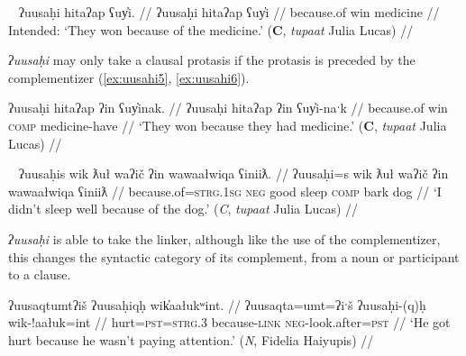 \ex~ \label{ex:uusahi4}
\begingl
\glpreamble *ʔuusaḥi hitaʔap ʕuy̓i. //
\gla ʔuusaḥi hitaʔap ʕuy̓i //
\glb because.of win medicine //
\glft Intended: `They won because of the medicine.' (\textbf{C}, \textit{tupaat} Julia Lucas) //
\endgl
\xe

\textit{ʔuusaḥi} may only take a clausal protasis if the protasis is preceded by the complementizer (\ref{ex:uusahi5}, \ref{ex:uusahi6}).

\ex \label{ex:uusahi5}
\begingl
\glpreamble ʔuusaḥi hitaʔap ʔin ʕuy̓inak. //
\gla ʔuusaḥi hitaʔap ʔin ʕuy̓i-naˑk //
\glb because.of win \textsc{comp} medicine-have  //
\glft `They won because they had medicine.' (\textbf{C}, \textit{tupaat} Julia Lucas) //
\endgl
\xe

\ex~ \label{ex:uusahi6}
\begingl
\glpreamble ʔuusaḥis wik ƛuł waʔič ʔin wawaałwiqa ʕiniiƛ. //
\gla ʔuusaḥi=s wik ƛuł waʔič ʔin wawaałwiqa ʕiniiƛ //
\glb because.of=\textsc{strg.1sg} \textsc{neg} good sleep \textsc{comp} bark dog  //
\glft `I didn't sleep well because of the dog.' (\textit{C}, \textit{tupaat} Julia Lucas) //
\endgl
\xe

\begin{comment}
[[TODO: uusahi plus linker ]]
\textit{ʔuusaḥi} may only be able to take the linker when it is non-initial. Both consultants with whom I attempted to add a linker to an ʔuusaḥi-initial sentence were uncertain if it was okay or not but felt it was weird (\ref{ex:uusahi7}, \ref{ex:uusahi8}).

\ex \label{ex:uusahi7}
\begingl
\glpreamble ?? ʔuusaḥiqḥita nay̓aqakʔi wikitaḥ ƛuł weʔič. //
\gla ʔuusaḥi-(q)ḥ=(m)it=(m)aˑ nay̓aqak=ʔiˑ wik=(m)it=(m)aˑḥ ƛuł weʔič //
\glb because.of-\textsc{link}=\textsc{pst}=\textsc{real.3} baby=\textsc{art} \textsc{neg}=\textsc{pst}=\textsc{real.1sg} good sleep //
\glft Intended: `I didn't sleep well because of the baby.' (\textbf{B}, Bob Mundy) //
\endgl
\xe

*? ʔuusaḥiqḥʔiš ʔuusaqta wik̓aałukʷint

ʔuusaqtumtʔiš ʔuusaḥiqḥ wik̓aałukʷint
\end{comment}

\textit{ʔuusaḥi} is able to take the linker, although like the use of the complementizer, this changes the syntactic category of its complement, from a noun or participant to a clause.

\ex \label{ex:uusahiqh}
\begingl
\glpreamble ʔuusaqtumtʔiš ʔuusaḥiqḥ wik̓aałukʷint. //
\gla ʔuusaqta=umt=ʔiˑš ʔuusaḥi-(q)ḥ wik-!aałuk=int //
\glb hurt=\textsc{pst}=\textsc{strg.3} because-\textsc{link} \textsc{neg}-look.after=\textsc{pst}  //
\glft `He got hurt because he wasn't paying attention.' (\textit{N}, Fidelia Haiyupis) //
\endgl
\xe

